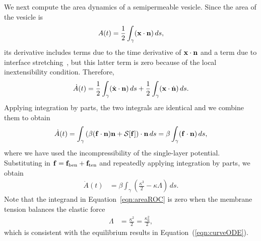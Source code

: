 \documentclass[prb,preprint,showpacs,preprintnumbers,amsmath,amssymb,longbibliography]{revtex4-1}
\begin{document}
We next compute the area dynamics of a semipermeable vesicle. Since the
area of the vesicle is
\begin{align}
  A(t) = \frac{1}{2}\int_{\gamma} (\mathbf{x} \cdot \mathbf{n})\, ds,
  \label{eqn:area}
\end{align}
its derivative includes terms due to the time derivative of $\mathbf{x} \cdot
\mathbf{n}$ and a term due to interface stretching~\cite{lai-tse-hua2008}, but
this latter term is zero because of the local inextensibility condition.
Therefore,
\begin{align}
  \dot{A}(t) =
  \frac{1}{2} \int_{\gamma} (\dot{\mathbf{x}} \cdot \mathbf{n})\, ds  + 
  \frac{1}{2} \int_{\gamma} (\mathbf{x} \cdot \dot{\mathbf{n}})\, ds.
\end{align}
Applying integration by parts, the two integrals are identical and we combine them to obtain
\begin{align}
  \dot{A}(t) = \int_\gamma \left(\beta (\mathbf{f} \cdot \mathbf{n})\mathbf{n} 
    + \mathcal{S}[\mathbf{f}]\right) \cdot \mathbf{n}\, ds 
  = \beta \int_\gamma (\mathbf{f} \cdot \mathbf{n})\, ds,
\end{align}
where we have used the incompressibility of the single-layer potential.
Substituting in $\mathbf{f} = \mathbf{f}_\mathrm{ben} + \mathbf{f}_\mathrm{ten}$ and
repeatedly applying integration by parts, we obtain
\begin{align}
  \dot{A}(t) & = \beta \int_\gamma \left(
    \frac{\kappa^3}{2} - \kappa \Lambda \right) \, ds.
  \label{eqn:areaROC}
\end{align}
Note that the integrand in Equation~\eqref{eqn:areaROC} is zero when the membrane tension balances the elastic force
\begin{align}
\label{eqn:areaROC2}
\Lambda &= \frac{\kappa^2}{2}=\frac{\kappa_0^2}{2},
\end{align}
which is consistent with the equilibrium results in Equation~(\ref{eqn:curveODE}).
\end{document}
